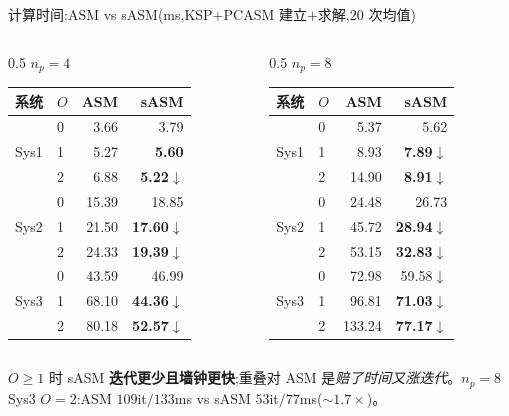 \documentclass[aspectratio=169,11pt,fontset=fandol]{ctexbeamer}
\newcommand{\dn}{\textcolor{good}{$\downarrow$}}
\begin{document}
\begin{frame}{计算时间:ASM vs sASM(ms,KSP+PCASM 建立$+$求解,$20$ 次均值)}
\begin{columns}[T]
\begin{column}{0.5\textwidth}
\centering $n_p=4$\\[0.2em]
\begin{table}\scriptsize
\begin{tabular}{@{}llrr@{}}
\toprule
系统 & $O$ & ASM & sASM \\
\midrule
\multirow{3}{*}{Sys1}&0&3.66&3.79\\&1&5.27&\textbf{5.60}\\&2&6.88&\textbf{5.22}\dn\\
\midrule
\multirow{3}{*}{Sys2}&0&15.39&18.85\\&1&21.50&\textbf{17.60}\dn\\&2&24.33&\textbf{19.39}\dn\\
\midrule
\multirow{3}{*}{Sys3}&0&43.59&46.99\\&1&68.10&\textbf{44.36}\dn\\&2&80.18&\textbf{52.57}\dn\\
\bottomrule
\end{tabular}
\end{table}
\end{column}
\begin{column}{0.5\textwidth}
\centering $n_p=8$\\[0.2em]
\begin{table}\scriptsize
\begin{tabular}{@{}llrr@{}}
\toprule
系统 & $O$ & ASM & sASM \\
\midrule
\multirow{3}{*}{Sys1}&0&5.37&5.62\\&1&8.93&\textbf{7.89}\dn\\&2&14.90&\textbf{8.91}\dn\\
\midrule
\multirow{3}{*}{Sys2}&0&24.48&26.73\\&1&45.72&\textbf{28.94}\dn\\&2&53.15&\textbf{32.83}\dn\\
\midrule
\multirow{3}{*}{Sys3}&0&72.98&59.58\dn\\&1&96.81&\textbf{71.03}\dn\\&2&133.24&\textbf{77.17}\dn\\
\bottomrule
\end{tabular}
\end{table}
\end{column}
\end{columns}
\vspace{0.2em}
\footnotesize $O{\ge}1$ 时 sASM \textbf{迭代更少且墙钟更快};重叠对 ASM 是\emph{赔了时间又涨迭代}。$n_p{=}8$ Sys3 $O{=}2$:ASM $109$it$/133$ms vs sASM $53$it$/77$ms($\sim1.7\times$)。
\end{frame}
\end{document}
